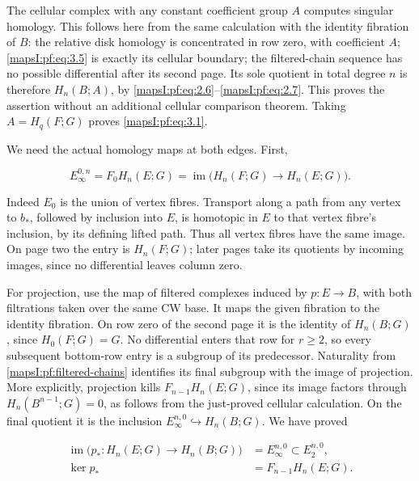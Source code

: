 \documentclass[11pt]{article}
\begin{document}
The cellular complex with any constant coefficient group \(A\) computes singular homology. This follows here from the same calculation with the identity fibration of \(B\): the relative disk homology is concentrated in row zero, with coefficient \(A\); \eqref{mapsI:pf:eq:3.5} is exactly its cellular boundary; the filtered-chain sequence has no possible differential after its second page. Its sole quotient in total degree \(n\) is therefore \(H_n(B;A)\), by \eqref{mapsI:pf:eq:2.6}--\eqref{mapsI:pf:eq:2.7}. This proves the assertion without an additional cellular comparison theorem. Taking \(A=H_q(F;G)\) proves \eqref{mapsI:pf:eq:3.1}.

We need the actual homology maps at both edges. First,

\begin{equation}
E_\infty^{0,n}=F_0H_n(E;G)
=\operatorname{im}\bigl(H_n(F;G)\to H_n(E;G)\bigr).
\label{mapsI:pf:eq:3.9}
\end{equation}

Indeed \(E_0\) is the union of vertex fibres. Transport along a path from any vertex to \(b_*\), followed by inclusion into \(E\), is homotopic in \(E\) to that vertex fibre's inclusion, by its defining lifted path. Thus all vertex fibres have the same image. On page two the entry is \(H_n(F;G)\); later pages take its quotients by incoming images, since no differential leaves column zero.

For projection, use the map of filtered complexes induced by \(p:E\to B\), with both filtrations taken over the same CW base. It maps the given fibration to the identity fibration. On row zero of the second page it is the identity of \(H_n(B;G)\), since \(H_0(F;G)=G\). No differential enters that row for \(r\geq2\), so every subsequent bottom-row entry is a subgroup of its predecessor. Naturality from \cref{mapsI:pf:filtered-chains} identifies its final subgroup with the image of projection. More explicitly, projection kills \(F_{n-1}H_n(E;G)\), since its image factors through \(H_n(B^{n-1};G)=0\), as follows from the just-proved cellular calculation. On the final quotient it is the inclusion \(E_\infty^{n,0}\hookrightarrow H_n(B;G)\). We have proved

\begin{equation}
\begin{aligned}
\operatorname{im}\bigl(p_*:H_n(E;G)\to H_n(B;G)\bigr)
&=E_\infty^{n,0}\subset E_2^{n,0},\\
\ker p_*&=F_{n-1}H_n(E;G).
\end{aligned}
\label{mapsI:pf:eq:3.10}
\end{equation}
\end{document}
